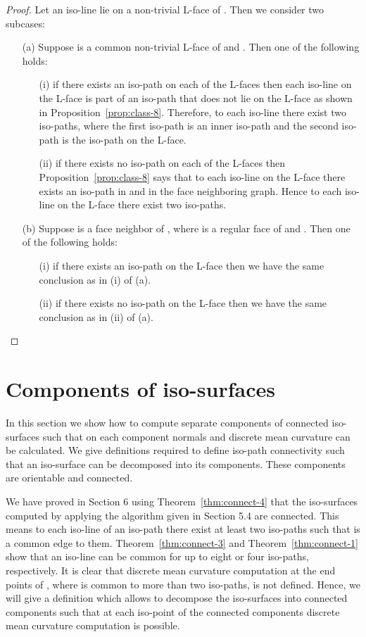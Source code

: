 \documentclass[a4paper,11pt]{article}
\begin{document}
\begin{proof}
 Let an iso-line  lie on a non-trivial L-face  of
. Then we consider two subcases:
\begin{itemize}
\item[(a)] Suppose  is a common non-trivial L-face of  and . Then
one of the following holds:
\begin{itemize}
\item[(i)] if there exists an iso-path on each of the L-faces then each iso-line on the L-face is part of an
iso-path that does not lie on the L-face as shown in Proposition~\ref{prop:class-8}. Therefore, to each iso-line
there exist two iso-paths, where the first iso-path is an inner iso-path and the second iso-path is the
iso-path on the L-face.
\item[(ii)] if there exists no iso-path on each of the L-faces then Proposition~\ref{prop:class-8} says that
to each iso-line on the L-face there exists an iso-path in  and in the face neighboring graph. Hence to
each iso-line on the L-face there exist two iso-paths.
\end{itemize}
\item[(b)] Suppose  is a face neighbor of , where
 is a regular face of  and . Then one of the following
holds:
\begin{itemize}
\item[(i)] if there exists an iso-path on the L-face then we have the same conclusion as in (i) of (a).
\item[(ii)] if there exists no iso-path on the L-face then we have the same conclusion as in (ii) of (a).
\end{itemize}
\end{itemize}
\vspace{-0.7cm}
\end{proof}

\section{Components of iso-surfaces}
In this section we show how to compute separate components of connected iso-surfaces such that
on each component normals and discrete mean curvature can be calculated. We give definitions required to define
iso-path connectivity such that an iso-surface can be decomposed into its components. These components
are orientable and connected.

We have proved in Section 6 using Theorem~\ref{thm:connect-4} that the iso-surfaces computed by
applying the algorithm given in Section 5.4 are connected. This means to each iso-line  of
an iso-path there exist at least two iso-paths such that  is a common edge to them.
Theorem~\ref{thm:connect-3} and Theorem~\ref{thm:connect-1} show that an iso-line  can be
common for up to eight or four iso-paths, respectively. It is clear that discrete mean curvature
computation at the end points of , where  is common to more than two iso-paths, is not defined.
Hence, we will give a definition which allows to decompose the iso-surfaces into connected components
such that at each iso-point of the connected components discrete mean curvature computation is possible.
\end{document}
